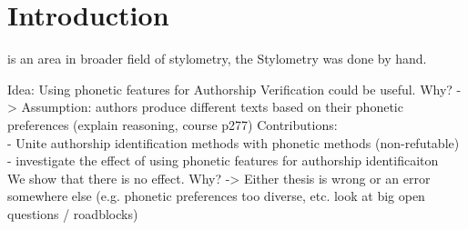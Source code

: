 \chapter{Introduction}\label{introduction}



 is an area in broader field of stylometry, the
Stylometry was done by hand.




Idea: Using phonetic features for Authorship Verification could be useful.
Why?
-> Assumption: authors produce different texts based on their phonetic preferences (explain reasoning, course p277)
Contributions:\\
- Unite authorship identification methods with phonetic methods (non-refutable)\\
- investigate the effect of using phonetic features for authorship identificaiton\\

We show that there is no effect.
Why?
-> Either thesis is wrong or an error somewhere else (e.g. phonetic preferences too diverse, etc. look at big open questions / roadblocks)











